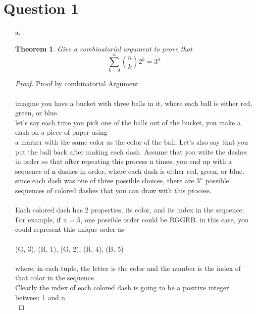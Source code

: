 \documentclass[11pt,fleqn]{article}
\newtheorem*{theorem}{Theorem}
\theoremstyle{definition}
\theoremstyle{remark}
\begin{document}
\section{Question 1}
\begin{enumerate}
    \item[a.]
    \begin{theorem}
        \normalfont Give a combinatorial argument to prove that 
        \[
        \sum_{k=0}^{n} \binom{n}{k} 2^k = 3^n
        \]
    \end{theorem}
    \begin{proof} Proof by combinatorial Argument \\\\
        imagine you have a bucket with three balls in it, where each ball
        is either red, green, or blue.\\

        let's say each time you pick one of the balls out of the bucket,
        you make a dash on a piece of paper using\\
        a marker with the same color as the color of the ball.
        Let's also say that you put the ball back after making each dash. Assume that
        you write the dashes in order so that after repeating this process
        n times, you end up with a sequence of n dashes in order, where 
        each dash is either red, green, or blue.\\

        since each dash was one of three possible choices, there are 
        ${3}^{n}$ possible sequences of colored dashes 
        that you can draw with this process.\\\\

        Each colored dash has 2 properties, its color, and its index in
        the sequence.\\
        For example, if n = 5, one possible order could be RGGRB.
        in this case, you could represent this unique order as\\\\
        (G, 3), (R, 1), (G, 2), (R, 4), (B, 5)\\\\ 
        where, in each tuple, the letter is the color and
        the number is the index of that color in the sequence.\\

        Clearly the index of each colored dash is going to be a 
        positive integer between 1 and n\\


\end{proof}
\end{enumerate}
\end{document}
